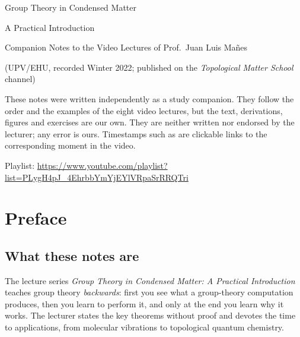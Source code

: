 \documentclass[11pt,openright]{book}
\begin{document}
\frontmatter
\begin{titlepage}
\centering
\vspace*{3cm}
{\LARGE\mdseries Group Theory in Condensed Matter\par}
\vspace{0.4cm}
{\Large A Practical Introduction\par}
\vspace{1.2cm}
{\large Companion Notes to the Video Lectures of Prof.\ Juan Luis Ma\~nes\par}
\vspace{0.3cm}
{\normalsize (UPV/EHU, recorded Winter 2022; published on the \emph{Topological Matter School} channel)\par}
\vspace{2cm}
\begin{minipage}{0.8\textwidth}\small
These notes were written independently as a study companion. They follow the
order and the examples of the eight video lectures, but the text, derivations,
figures and exercises are our own. They are neither written nor endorsed by the
lecturer; any error is ours. Timestamps such as  are clickable
links to the corresponding moment in the video.
\end{minipage}
\vfill
{\small Playlist: \url{https://www.youtube.com/playlist?list=PLygH4pJ_4EhrbbYmYjEYlVRpaSrRRQTri}\par}
\end{titlepage}

\tableofcontents

\chapter*{Preface}

\section*{What these notes are}
The lecture series \emph{Group Theory in Condensed Matter: A Practical Introduction}
teaches group theory \emph{backwards}: first you see what a group-theory computation
produces, then you learn to perform it, and only at the end you learn why it works.
The lecturer states the key theorems without proof and devotes the time to
applications, from molecular vibrations to topological quantum chemistry.
\end{document}
